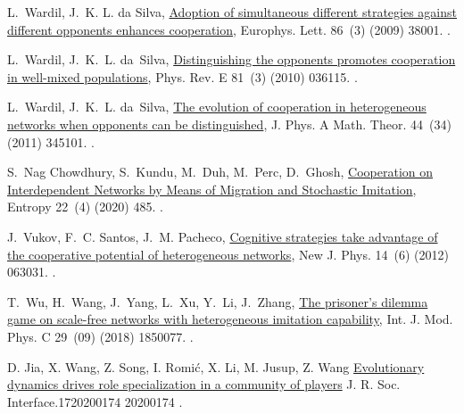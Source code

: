\documentclass[5p,review]{elsarticle}
\begin{document}
\begin{thebibliography}{10}
L.~Wardil, J.~{K. L. da Silva},
  \href{http://iopscience.iop.org/article/10.1209/0295-5075/86/38001/meta}{{Adoption
  of simultaneous different strategies against different opponents enhances
  cooperation}}, Europhys. Lett. 86~(3) (2009) 38001.
\newblock \href {http://dx.doi.org/10.1209/0295-5075/86/38001}
  {}.

L.~Wardil, J.~K.~L. da~Silva,
  \href{http://link.aps.org/doi/10.1103/PhysRevE.81.036115}{{Distinguishing the
  opponents promotes cooperation in well-mixed populations}}, Phys. Rev. E
  81~(3) (2010) 036115.
\newblock \href {http://dx.doi.org/10.1103/PhysRevE.81.036115}
  {}.

L.~Wardil, J.~K.~L. da~Silva,
  \href{http://stacks.iop.org/1751-8121/44/i=34/a=345101?key=crossref.2353076aa941721b4d538bf0cfb39c6d}{{The
  evolution of cooperation in heterogeneous networks when opponents can be
  distinguished}}, J. Phys. A Math. Theor. 44~(34) (2011) 345101.
\newblock \href {http://dx.doi.org/10.1088/1751-8113/44/34/345101}
  {}.

S.~{Nag Chowdhury}, S.~Kundu, M.~Duh, M.~Perc, D.~Ghosh,
  \href{https://www.mdpi.com/1099-4300/22/4/485}{{Cooperation on Interdependent
  Networks by Means of Migration and Stochastic Imitation}}, Entropy 22~(4)
  (2020) 485.
\newblock \href {http://dx.doi.org/10.3390/e22040485}
  {}.

J.~Vukov, F.~C. Santos, J.~M. Pacheco,
  \href{http://stacks.iop.org/1367-2630/14/i=6/a=063031?key=crossref.c59076550557ff04cc9b9394e5d5d5c1
  https://iopscience.iop.org/article/10.1088/1367-2630/14/6/063031}{{Cognitive
  strategies take advantage of the cooperative potential of heterogeneous
  networks}}, New J. Phys. 14~(6) (2012) 063031.
\newblock \href {http://dx.doi.org/10.1088/1367-2630/14/6/063031}
  {}.

T.~Wu, H.~Wang, J.~Yang, L.~Xu, Y.~Li, J.~Zhang,
  \href{https://www.worldscientific.com/doi/abs/10.1142/S0129183118500778}{{The prisoner's dilemma game on scale-free networks with heterogeneous imitation capability}}, Int. J. Mod. Phys. C 29~(09) (2018) 1850077.
\newblock \href {http://dx.doi.org/10.1142/S0129183118500778}
  {}.

D. Jia, X. Wang, Z. Song, I. Romić, X. Li, M. Jusup, Z. Wang
\href{https://royalsocietypublishing.org/doi/10.1098/rsif.2020.0174}
{Evolutionary dynamics drives role specialization in a community of players} J. R. Soc. Interface.1720200174 20200174
\newblock \href {http://doi.org/10.1098/rsif.2020.0174}
  {}.


\end{thebibliography}
\end{document}
